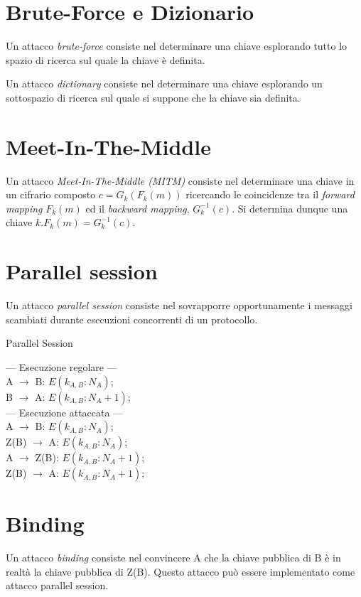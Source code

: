 \section{Brute-Force e Dizionario}
Un attacco \textit{brute-force} consiste nel determinare una chiave esplorando tutto lo spazio di ricerca sul quale la chiave è definita.

Un attacco \textit{dictionary} consiste nel determinare una chiave esplorando un sottospazio di ricerca sul quale si suppone che la chiave sia definita.

\section{Meet-In-The-Middle}
Un attacco \textit{Meet-In-The-Middle (MITM)} consiste nel determinare una chiave in un cifrario composto $c=G_{k}(F_{k}(m))$ ricercando le coincidenze tra il \textit{forward mapping} $F_{k}(m)$ ed il \textit{backward mapping}, $G_{k}^{-1}(c)$. Si determina dunque una chiave $k.F_{k}(m)=G_{k}^{-1}(c)$.

\section{Parallel session}
Un attacco \textit{parallel session} consiste nel sovrapporre opportunamente i messaggi scambiati durante esecuzioni concorrenti di un protocollo.

\bigskip
\begin{algorithm}[H]
  \caption{Parallel Session}
  \label{alg:attack-parallel-session}
  \SetAlgoNoLine
  --- Esecuzione regolare --- \\
  A $\rightarrow$ B: $E(k_{A,B}:N_{A})$;\\
  B $\rightarrow$ A: $E(k_{A,B}:N_{A}+1)$;\\
  --- Esecuzione attaccata --- \\
  A $\rightarrow$ B: $E(k_{A,B}:N_{A})$;\\
  Z(B) $\rightarrow$ A: $E(k_{A,B}:N_{A})$;\\
  A $\rightarrow$ Z(B): $E(k_{A,B}:N_{A}+1)$;\\
  Z(B) $\rightarrow$ A: $E(k_{A,B}:N_{A}+1)$;
\end{algorithm}

\section{Binding}
Un attacco \textit{binding} consiste nel convincere A che la chiave pubblica di B è in realtà la chiave pubblica di Z(B). Questo attacco può essere implementato come attacco parallel session.

